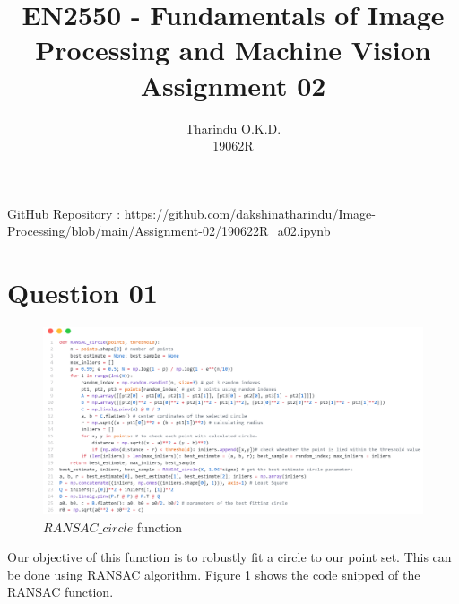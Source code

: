 \documentclass[a4paper]{article}
\title{\textbf{EN2550 - Fundamentals of Image Processing and Machine Vision}\\
Assignment 02}
\author{Tharindu O.K.D.\\19062R}
\begin{document}
\maketitle
GitHub Repository : \url{https://github.com/dakshinatharindu/Image-Processing/blob/main/Assignment-02/190622R_a02.ipynb}

\section*{Question 01}
\begin{figure}[!htb]
    \centering
    \includegraphics[width=\textwidth]{images/ransac_circle.png}
    \caption{$RANSAC\_circle$ function}
    \label{ransac_circle}
\end{figure}
Our objective of this function is to robustly fit a circle to our point set. This can be done using RANSAC
algorithm. Figure 1 shows the code snipped of the RANSAC function.
 
\end{document}
